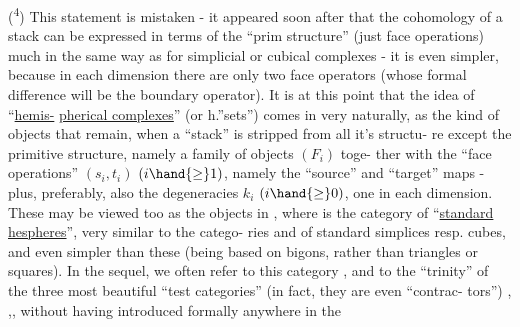 (\textsuperscript{4})  This statement is mistaken - it appeared soon
after that the cohomology of a stack can be expressed in terms of the
``prim structure'' (just face operations) much in the same way as for
simplicial or cubical complexes - it is even simpler, because in each
dimension there are only two face operators (whose formal difference will
be the boundary operator). It is at this point that the idea of ``\uline{hemis-}%
\uline{pherical complexes}'' (or h.''sets'') comes in very naturally, as the kind
of objects that remain, when a ``stack'' is stripped from all it's structu-%
re except the primitive structure, namely a family of objects $(F_i)$ toge-%
ther with the ``face operations'' $(s_i,t_i)$ $(i \hand{\ensuremath{\geq}} 1)$, namely the ``source'' and
``target'' maps - plus, preferably, also the degeneracies $k_i$ $(i \hand{\ensuremath{\geq}} 0)$, one
in each dimension. These may be viewed too as the objects in \hand{\ensuremath{^{\wedge}}}, where
 is the category of ``\uline{standard hespheres}'', very similar to the catego-%
ries \hand{\ensuremath{\Delta}} and \hand{\ensuremath{\square}} of standard simplices resp. cubes, and even simpler than
these (being based on bigons, rather than  triangles or squares). In the
sequel, we often refer to this category , and to the ``trinity'' of the
three most beautiful ``test categories'' (in fact, they are even ``contrac-%
tors'') ,\hand{\ensuremath{\Delta}} ,\hand{\ensuremath{\square}}, without having introduced formally  anywhere in the
